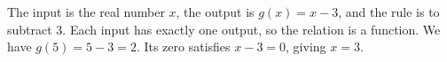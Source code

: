 The input is the real number $x$, the output is $g(x)=x-3$, and the rule is to subtract 3. Each input has exactly one output, so the relation is a function. We have $g(5)=5-3=\boxed2$. Its zero satisfies $x-3=0$, giving $\boxed{x=3}$.
